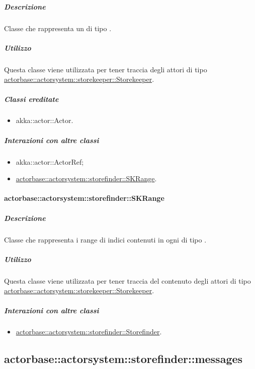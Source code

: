 \documentclass{scalatekids-article}
\begin{document}
\subparagraph{Descrizione}

Classe che rappresenta un  di tipo .

\subparagraph{Utilizzo}

Questa classe viene utilizzata per tener traccia degli attori di tipo
\hyperref[sec:actorbase::actorsystem::storekeeper::Storekeeper]{actorbase::actorsystem::storekeeper::Storekeeper}.

\subparagraph{Classi ereditate}

\begin{itemize}

\item akka::actor::Actor.

\end{itemize}

\subparagraph{Interazioni con altre classi}

\begin{itemize}
\item akka::actor::ActorRef;
\item \hyperref[sec:actorbase::actorsystem::storefinder::SKRange]{actorbase::actorsystem::storefinder::SKRange}.
\end{itemize}

\paragraph{actorbase::actorsystem::storefinder::SKRange}
\label{sec:actorbase::actorsystem::storefinder::SKRange}

\subparagraph{Descrizione}

Classe che rappresenta i range di indici contenuti in ogni  di tipo
.

\subparagraph{Utilizzo}

Questa classe viene utilizzata per tener traccia del contenuto degli attori di tipo
\hyperref[sec:actorbase::actorsystem::storekeeper::Storekeeper]{actorbase::\allowbreak{}actorsystem::\allowbreak{}storekeeper::\allowbreak{}Storekeeper}.

\subparagraph{Interazioni con altre classi}

\begin{itemize}
\item \hyperref[sec:actorbase::actorsystem::storefinder::Storefinder]{actorbase::actorsystem::storefinder::Storefinder}.
\end{itemize}

\subsection{actorbase::actorsystem::storefinder::messages}
\label{sec:actorbase::actorsystem::storefinder::messages}
\end{document}
